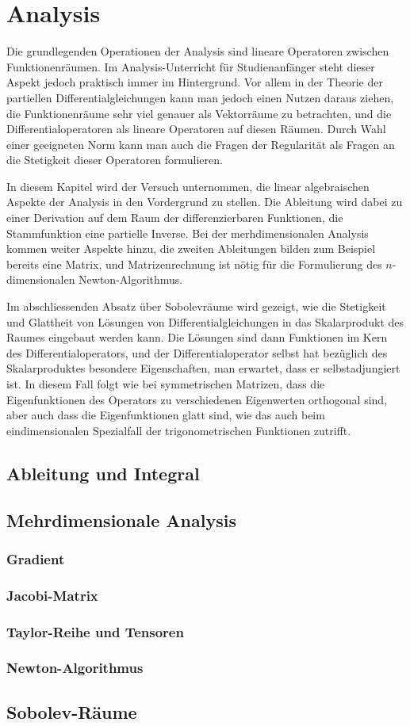 %
%
%
\chapter{Analysis}
\rhead{}
Die grundlegenden Operationen der Analysis sind lineare Operatoren
zwischen Funktionenräumen.
Im Analysis-Unterricht für Studienanfänger steht dieser Aspekt jedoch
praktisch immer im Hintergrund.
Vor allem in der Theorie der partiellen Differentialgleichungen 
kann man jedoch einen Nutzen daraus ziehen, die Funktionenräume
sehr viel genauer als Vektorräume zu betrachten, und die
Differentialoperatoren als lineare Operatoren auf diesen Räumen.
Durch Wahl einer geeigneten Norm kann man auch die Fragen der
Regularität als Fragen an die Stetigkeit dieser Operatoren
formulieren.

In diesem Kapitel wird der Versuch unternommen, die linear algebraischen
Aspekte der Analysis in den Vordergrund zu stellen.
Die Ableitung wird dabei zu einer Derivation auf dem Raum der
differenzierbaren Funktionen, die Stammfunktion eine partielle
Inverse.
Bei der merhdimensionalen Analysis kommen weiter Aspekte hinzu, die
zweiten Ableitungen bilden zum Beispiel bereits eine Matrix,
und Matrizenrechnung ist nötig für die Formulierung des
$n$-dimensionalen Newton-Algorithmus.

Im abschliessenden Absatz über Sobolevräume wird gezeigt, wie
die Stetigkeit und Glattheit von Lösungen von Differentialgleichungen
in das Skalarprodukt des Raumes eingebaut werden kann.
Die Lösungen sind dann Funktionen im Kern des Differentialoperators,
und der Differentialoperator selbst hat bezüglich des Skalarproduktes
besondere Eigenschaften, man erwartet, dass er selbstadjungiert ist.
In diesem Fall folgt wie bei symmetrischen Matrizen, dass die
Eigenfunktionen des Operators zu verschiedenen Eigenwerten orthogonal 
sind, aber auch dass die Eigenfunktionen glatt sind, wie das auch
beim eindimensionalen Spezialfall der trigonometrischen Funktionen
zutrifft.

\section{Ableitung und Integral}

\section{Mehrdimensionale Analysis}
\subsection{Gradient}
\subsection{Jacobi-Matrix}
\subsection{Taylor-Reihe und Tensoren}
\subsection{Newton-Algorithmus}

\section{Sobolev-Räume}

